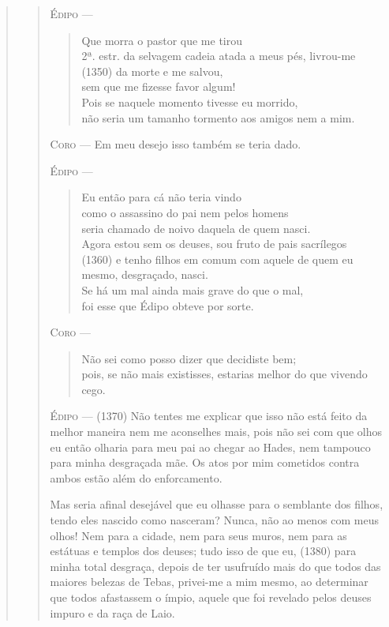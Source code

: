 \begin{verse}
\begin{verse}
\textsc{Édipo} --- \begin{verse}Que morra o pastor que me tirou\\ 2ª. estr.
da selvagem cadeia atada a meus pés, livrou-me\\ (1350)
da morte e me salvou,\\
sem que me fizesse favor algum!\\
Pois se naquele momento tivesse eu morrido,\\
não seria um tamanho tormento aos amigos nem a mim.
\end{verse}

\textsc{Coro} --- Em meu desejo isso também se teria dado.

\textsc{Édipo} --- \begin{verse}Eu então para cá não teria vindo\\
como o assassino do pai nem pelos homens\\
seria chamado de noivo daquela de quem nasci.\\
Agora estou sem os deuses, sou fruto de pais sacrílegos\\ (1360)
e tenho filhos em comum com aquele de quem eu mesmo, desgraçado, nasci.\\
Se há um mal ainda mais grave do que o mal,\\
foi esse que Édipo obteve por sorte.
\end{verse}

\textsc{Coro} --- \begin{verse}Não sei como posso dizer que decidiste bem;\\
pois, se não mais existisses, estarias melhor do que vivendo cego.
\end{verse}

\textsc{Édipo} --- (1370) Não tentes me explicar que isso não está feito da melhor maneira
nem me aconselhes mais, pois não sei com que olhos eu então olharia para
meu pai ao chegar ao Hades, nem tampouco para minha desgraçada mãe. Os
atos por mim cometidos contra ambos estão além do enforcamento.

Mas seria afinal desejável que eu olhasse para o semblante dos filhos,
tendo eles nascido como nasceram? Nunca, não ao menos com meus olhos!
Nem para a cidade, nem para seus muros, nem para as estátuas e templos
dos deuses; tudo isso de que eu, (1380) para minha total desgraça,
depois de ter usufruído mais do que todos das maiores belezas de Tebas,
privei-me a mim mesmo, ao determinar que todos afastassem o ímpio,
aquele que foi revelado pelos deuses impuro e da raça de Laio.


\end{verse}
\end{verse}
